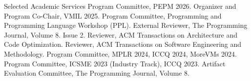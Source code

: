 \begin{rubric}{Selected Academic Services}
  \entry*[2026] Program Committee, PEPM 2026.
  \entry*[2025] Organizer and Program Co-Chair, VMIL 2025.
  \entry*[2025] Program Committee, Programming and Programming Language Workshop (PPL).
  \entry*[2024] External Reviewer, The Programming Journal, Volume 8. Issue 2.
  \entry*[2024] Reviewer, ACM Transactions on Architecture and Code Optimization.
  \entry*[2024] Reviewer, ACM Transactions on Software Engineering and Methodology.
  \entry*[2024] Program Committee, MPLR 2024, ICCQ 2024, MoreVMs 2024.
  \entry*[2023] Program Committee, ICSME 2023 (Industry Track), ICCQ 2023.
  \entry*[2023] Artifact Evaluation Committee, The Programming Journal, Volume 8.
\end{rubric}
